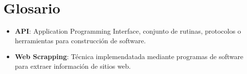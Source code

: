 \newpage
\section*{Glosario}
\begin{itemize}
  \item \textbf{API}: Application Programming Interface, conjunto de rutinas, protocolos o herramientas para construcción de software.
   \item \textbf{Web Scrapping}:  Técnica implemendatada mediante programas de software para extraer información de sitios web.
\end{itemize}
